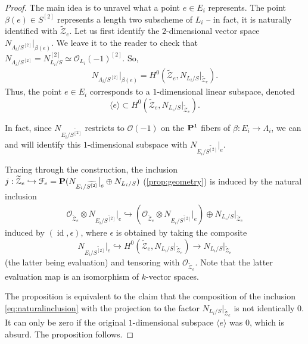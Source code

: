 \documentclass[12pt,reqno]{amsart}
\DeclareMathOperator{\id}{id}
\renewcommand{\to}{{\longrightarrow}}
\numberwithin{equation}{section}
\renewcommand{\O}{\mathcal O}
\newcommand{\td}{\widetilde}
\begin{document}
\begin{proof}
  The main idea is to unravel what a point $e \in E_{i}$ represents.
  The point $\beta(e) \in S^{[2]}$ represents a length two subscheme
  of $L_{i}$ -- in fact, it is naturally identified with
  $\td{\mathcal{Z}}_{e}$. Let us first identify the $2$-dimensional
  vector space $N_{\Lambda_{i}/S^{[2]}}\big|_{\beta(e)}$.  We leave it
  to the reader to check that
  $N_{\Lambda_{i}/S^{[2]}} = N_{L_{i}/S}^{[2]} \simeq
  \O_{L_{i}}(-1)^{[2]}$.  So,
  \begin{align}
    \label{eq:N2}
    N_{\Lambda_{i}/S^{[2]}}\big|_{\beta(e)} = H^{0}\left(\td{\mathcal{Z}}_{e}, N_{L_{i}/S}\big|_{\td{\mathcal{Z}}_{e}}\right). 
  \end{align}
  Thus, the point $e \in E_{i}$ corresponds to a $1$-dimensional
  linear subspace, denoted
  \[\langle e \rangle \subset H^{0}\left(\td{\mathcal{Z}}_{e},
      N_{L_{i}/S}\big|_{\td{\mathcal{Z}}_{e}}\right).\]

  In fact, since $N_{E_{i}/\td{S^{[2]}}}$ restricts to $\O(-1)$ on the
  $\P^{1}$ fibers of $\beta: E_{i} \to \Lambda_{i}$, we can and will
  identify this $1$-dimensional subspace with
  $N_{E_{i}/\td{S^{[2]}}}\big|_{e}$.

  Tracing through the construction, the inclusion
  $j: \td{\mathcal{Z}}_{e} \hookrightarrow \mathcal{F}_{e} =
  \P(N_{E_{i}/\td{S^{[2]}}}\big|_{e} \oplus N_{L_{i}/S})$
  (\autoref{prop:geometry}) is induced by the natural inclusion
  \begin{align}
    \label{eq:naturalinclusion}
    \O_{\td{\mathcal{Z}}_{e}} \otimes N_{E_{i}/\td{S^{[2]}}}\big|_{e} \hookrightarrow \left(\O_{\td{\mathcal{Z}}_{e}} \otimes N_{E_{i}/\td{S^{[2]}}}\big|_{e} \right) \oplus N_{L_{i}/S}\big|_{\td{\mathcal{Z}}_{e}}
  \end{align}
  induced by $(\id, \epsilon)$, where $\epsilon$ is obtained by taking
  the composite
  \[N_{E_{i}/\td{S^{[2]}}}\big|_{e} \hookrightarrow
    H^{0}\left(\td{\mathcal{Z}}_{e},
      N_{L_{i}/S}\big|_{\td{\mathcal{Z}}_{e}}\right) \to
    N_{L_{i}/S}\big|_{\td{\mathcal{Z}}_{e}}\] (the latter being
  evaluation) and tensoring with $ \O_{\td{\mathcal{Z}}_{e}}$. Note
  that the latter evaluation map is an isomorphism of $k$-vector
  spaces.

  The proposition is equivalent to the claim that the composition of
  the inclusion \eqref{eq:naturalinclusion} with the projection to the
  factor $ N_{L_{i}/S}\big|_{\td{\mathcal{Z}}_{e}}$ is not identically
  $0$.  It can only be zero if the original $1$-dimensional subspace
  $\langle e \rangle$ was $0$, which is absurd.  The proposition
  follows.
\end{proof}
\end{document}
